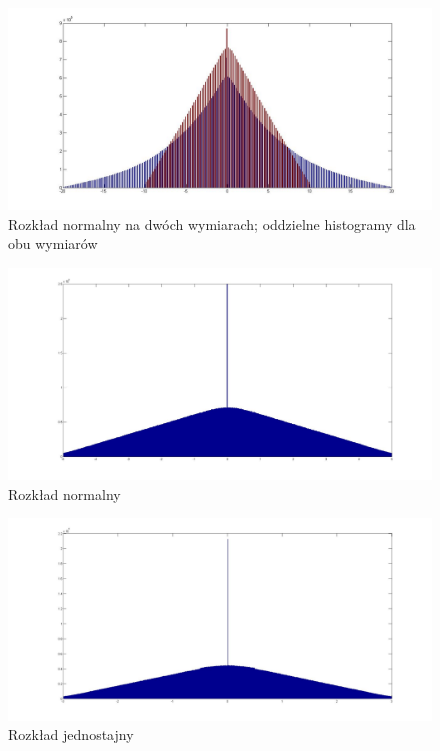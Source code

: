 \documentclass{mini}
\begin{document}
\begin{figure}[H]
\centering
\includegraphics[width=\textwidth]{ri_n_10M_2__20_20__10_10_4_1D}
\caption{Rozkład normalny na dwóch wymiarach; oddzielne histogramy dla obu wymiarów}
\end{figure}

\begin{figure}[H]
\centering
\includegraphics[width=\textwidth]{ri_n_20M_1__5_5}
\caption{Rozkład normalny}
\end{figure}

\begin{figure}[H]
\centering
\includegraphics[width=\textwidth]{ri_j_20M_1__3_3}
\caption{Rozkład jednostajny}
\end{figure}
\end{document}
